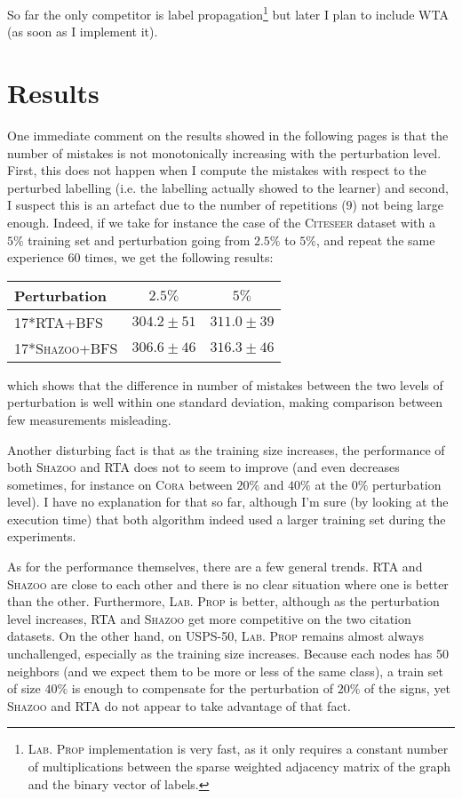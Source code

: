 \documentclass[a4paper,final,notitlepage,11pt,svgnames]{article}
\newcommand{\rta}{\textsc{RTA}}
\newcommand{\shazoo}{\textsc{Shazoo}}
\newcommand{\lprop}{\textsc{Lab. Prop}}
\newcommand{\cora}{\textsc{Cora}}
\newcommand{\citeseer}{\textsc{Citeseer}}
\newcommand{\usps}{\textsc{USPS-50}}
\begin{document}
So far the only competitor is label propagation\footnote{\lprop{} implementation
is very fast, as it only requires a constant number of multiplications between
the sparse weighted adjacency matrix of the graph and the binary vector of
labels.} but later I plan to include WTA~\autocite{WTA13} (as soon as I
implement it).

\section*{Results}
\label{sec:Results}

One immediate comment on the results showed in the following pages is that the
number of mistakes is not monotonically increasing with the perturbation level.
First, this does not happen when I compute the mistakes with respect to the
perturbed labelling (i.e. the labelling actually showed to the learner) and
second, I suspect this is an artefact due to the number of repetitions ($9$) not
being large enough. Indeed, if we take for instance the case of the \citeseer{}
dataset with a $5\%$ training set and perturbation going from $2.5\%$ to $5\%$,
and repeat the same experience 60 times, we get the following results:
\begin{center}
  \begin{tabular}{lcc}
    \toprule
    Perturbation & $2.5\%$ & $5\%$ \\
    \midrule
    17*\rta{}+BFS & $304.2 \pm 51$& $311.0 \pm 39$\\
    17*\shazoo{}+BFS & $306.6 \pm 46$& $316.3 \pm 46$\\
    \bottomrule
  \end{tabular}
\end{center}
which shows that the difference in number of mistakes between the two levels of
perturbation is well within one standard deviation, making comparison between few
measurements misleading.
\medskip

Another disturbing fact is that as the training size increases, the performance
of both \shazoo{} and \rta{} does not to seem to improve (and even decreases
sometimes, for instance on \cora{} between $20\%$ and $40\%$ at the $0\%$
perturbation level).  I have no explanation for that so far, although I'm sure
(by looking at the execution time) that both algorithm indeed used a larger
training set during the experiments.

As for the performance themselves, there are a few general trends. \rta{} and
\shazoo{} are close to each other and there is no clear situation where one is
better than the other. Furthermore, \lprop{} is better, although as the
perturbation level increases, \rta{} and \shazoo{} get more competitive on the
two citation datasets. On the other hand, on \usps{}, \lprop{} remains almost always
unchallenged, especially as the training size increases.  Because each nodes has
50 neighbors (and we expect them to be more or less of the same class), a train
set of size $40\%$ is enough to compensate for the perturbation of $20\%$ of the
signs, yet \shazoo{} and \rta{} do not appear to take advantage of that fact.
\end{document}

